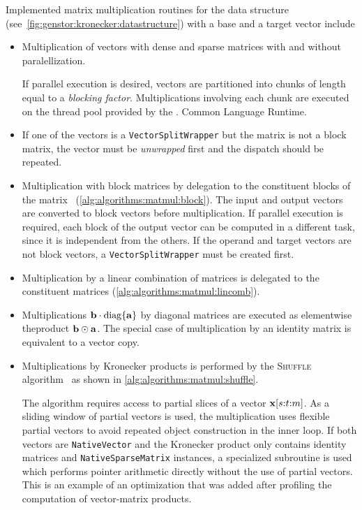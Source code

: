 Implemented matrix multiplication routines for the data structure
(see~\vref{fig:genstor:kronecker:datastructure}) with a base and a
target vector include
\begin{itemize}
\item Multiplication of vectors with dense and sparse matrices with
  and without paralellization.

  If parallel execution is desired, vectors are partitioned into
  chunks of length equal to a \emph{blocking factor}. Multiplications
  involving each chunk are executed on the thread pool provided by the
  . Common Language Runtime.
\item If one of the vectors is a \texttt{VectorSplitWrapper} but the
  matrix is not a block matrix, the vector must be \emph{unwrapped}
  first and the dispatch should be repeated.
\item Multiplication with block matrices by delegation to the
  constituent blocks of the matrix%
  ~(\vref{alg:algorithms:matmul:block}). The input and output vectors
  are converted to block vectors before multiplication. If parallel
  execution is required, each block of the output vector can be
  computed in a different task, since it is independent from the
  others. If the operand and target vectors are not block vectors, a
  \texttt{VectorSplitWrapper} must be created first.
\item Multiplication by a linear combination of matrices is delegated
  to the constituent matrices (\vref{alg:algorithms:matmul:lincomb}).
\item Multiplications $\bm{\mathrm{b}} \cdot \operatorname{diag}\{\bm{\mathrm{a}}\}$ by diagonal
  matrices are executed as elementwise theproduct
  $\bm{\mathrm{b}} \odot \bm{\mathrm{a}}$. The special case of multiplication by an
  identity matrix is equivalent to a vector copy.
\item Multiplications by Kronecker products is performed by the
  \textsc{Shuffle} algorithm~%
  \citep{DBLP:journals/informs/BuchholzCDK00,benoit2001memory} as
  shown in \vref{alg:algorithms:matmul:shuffle}.

  The algorithm requires access to partial slices of a vector
  $\bm{\mathrm{x}}[s{:}t{:}m]$. As a sliding window of partial vectors is
  used, the multiplication uses flexible partial vectors to avoid
  repeated object construction in the inner loop. If both vectors are
  \texttt{NativeVector} and the Kronecker product only contains
  identity matrices and \texttt{NativeSparseMatrix} instances, a
  specialized subroutine is used which performs pointer arithmetic
  directly without the use of partial vectors. This is an example of
  an optimization that was added after profiling the computation of
  vector-matrix products.


\end{itemize}
